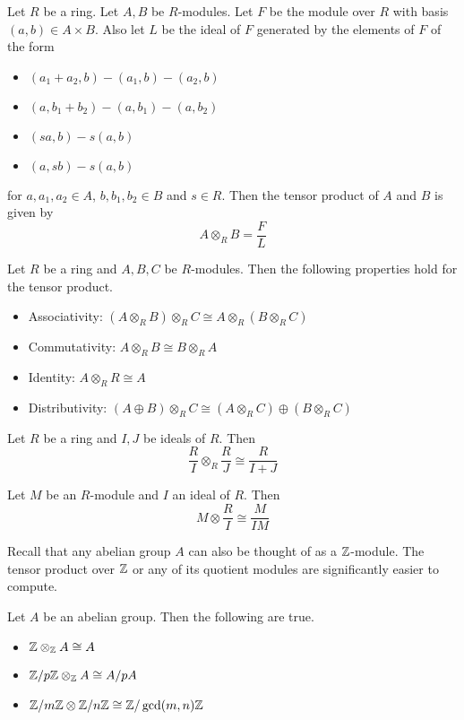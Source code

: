 \documentclass[a4paper]{article}
\begin{document}
\begin{lmm}{}{} Let $R$ be a ring. Let $A,B$ be $R$-modules. Let $F$ be the module over $R$ with basis $(a,b)\in A\times B$. Also let $L$ be the ideal of $F$ generated by the elements of $F$ of the form 
\begin{itemize}
\item $(a_1+a_2,b)-(a_1,b)-(a_2,b)$
\item $(a,b_1+b_2)-(a,b_1)-(a,b_2)$
\item $(sa,b)-s(a,b)$
\item $(a,sb)-s(a,b)$
\end{itemize}
for $a,a_1,a_2\in A$, $b,b_1,b_2\in B$ and $s\in R$. Then the tensor product of $A$ and $B$ is given by $$A\otimes_RB=\frac{F}{L}$$
\end{lmm}

\begin{prp}{}{} Let $R$ be a ring and $A,B,C$ be $R$-modules. Then the following properties hold for the tensor product. 
\begin{itemize}
\item Associativity: $(A\otimes_RB)\otimes_RC\cong A\otimes_R(B\otimes_RC)$
\item Commutativity: $A\otimes_R B\cong B\otimes_RA$
\item Identity: $A\otimes_RR\cong A$
\item Distributivity: $(A\oplus B)\otimes_R C\cong(A\otimes_RC)\oplus(B\otimes_RC)$
\end{itemize}
\end{prp}

\begin{prp}{}{} Let $R$ be a ring and $I,J$ be ideals of $R$. Then $$\frac{R}{I}\otimes_R\frac{R}{J}\cong\frac{R}{I+J}$$
\end{prp}

\begin{prp}{}{} Let $M$ be an $R$-module and $I$ an ideal of $R$. Then $$M\otimes\frac{R}{I}\cong\frac{M}{IM}$$
\end{prp}

Recall that any abelian group $A$ can also be thought of as a $\mathbb{Z}$-module. The tensor product over $\mathbb{Z}$ or any of its quotient modules are significantly easier to compute. 

\begin{prp}{}{} Let $A$ be an abelian group. Then the following are true. 
\begin{itemize}
\item $\mathbb{Z}\otimes_{\mathbb{Z}} A\cong A$
\item $\mathbb{Z}/p\mathbb{Z}\otimes_{\mathbb{Z}} A\cong A/pA$
\item $\mathbb{Z}/m\mathbb{Z}\otimes \mathbb{Z}/n\mathbb{Z}\cong\mathbb{Z}/\gcd(m,n)\mathbb{Z}$
\end{itemize}
\end{prp}
\end{document}
